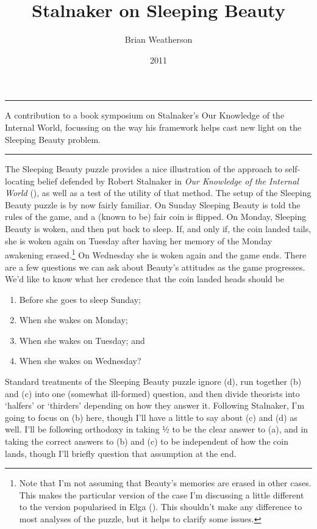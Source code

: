 \documentclass[
  10pt,
  letterpaper,
  DIV=11,
  numbers=noendperiod,
  twoside]{scrartcl}
\title{Stalnaker on Sleeping Beauty}
\author{Brian Weatherson}
\date{2011}
\providecommand{\tightlist}{%
  \setlength{\itemsep}{0pt}\setlength{\parskip}{0pt}}\usepackage{longtable,booktabs,array}
\renewenvironment{abstract}
 {\vspace{-1.25cm}
 \quotation\small\noindent\rule{\linewidth}{.5pt}\par\smallskip
 \noindent }
 {\par\noindent\rule{\linewidth}{.5pt}\endquotation}
\begin{document}
\maketitle
\begin{abstract}
A contribution to a book symposium on Stalnaker's Our Knowledge of the
Internal World, focussing on the way his framework helps cast new light
on the Sleeping Beauty problem.
\end{abstract}

The Sleeping Beauty puzzle provides a nice illustration of the approach
to self-locating belief defended by Robert Stalnaker in \emph{Our
Knowledge of the Internal World} (), as well as a test of the utility of that method. The setup of
the Sleeping Beauty puzzle is by now fairly familiar. On Sunday Sleeping
Beauty is told the rules of the game, and a (known to be) fair coin is
flipped. On Monday, Sleeping Beauty is woken, and then put back to
sleep. If, and only if, the coin landed tails, she is woken again on
Tuesday after having her memory of the Monday awakening
erased.\footnote{Note that I'm not assuming that Beauty's memories are
  erased in other cases. This makes the particular version of the case
  I'm discussing a little different to the version popularised in Elga
  (). This shouldn't make any difference to
  most analyses of the puzzle, but it helps to clarify some issues.} On
Wednesday she is woken again and the game ends. There are a few
questions we can ask about Beauty's attitudes as the game progresses.
We'd like to know what her credence that the coin landed heads should be

\begin{enumerate}
\def\labelenumi{\arabic{enumi}.}
\tightlist
\item
  Before she goes to sleep Sunday;
\item
  When she wakes on Monday;
\item
  When she wakes on Tuesday; and
\item
  When she wakes on Wednesday?
\end{enumerate}

Standard treatments of the Sleeping Beauty puzzle ignore (d), run
together (b) and (c) into one (somewhat ill-formed) question, and then
divide theorists into `halfers' or `thirders' depending on how they
answer it. Following Stalnaker, I'm going to focus on (b) here, though
I'll have a little to say about (c) and (d) as well. I'll be following
orthodoxy in taking ½ to be the clear answer to (a), and in taking the
correct answers to (b) and (c) to be independent of how the coin lands,
though I'll briefly question that assumption at the end.
\end{document}
